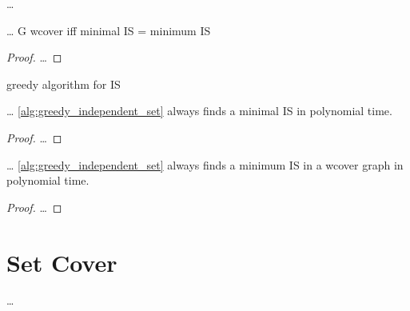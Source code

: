 

\begin{problem}
  \ldots{}
\end{problem}


\begin{theorem}
  \ldots{}
  G \gls{wcover} iff minimal IS = minimum IS
\end{theorem}

\begin{proof}
  \ldots{}
\end{proof}



\begin{algorithm}
  \caption{\label{alg:greedy_independent_set}greedy algorithm for IS}
\end{algorithm}


\begin{theorem}
  \ldots{}
  \cref{alg:greedy_independent_set} always finds a minimal IS in polynomial time.
\end{theorem}

\begin{proof}
  \ldots{}
\end{proof}


\begin{theorem}
  \label{thm:well_covered_minimum_independent_set}
  \ldots{}
  \cref{alg:greedy_independent_set} always finds a minimum IS in a \gls{wcover} graph in polynomial time.
\end{theorem}

\begin{proof}
  \ldots{}
\end{proof}

\section{Set Cover}
\ldots{}

